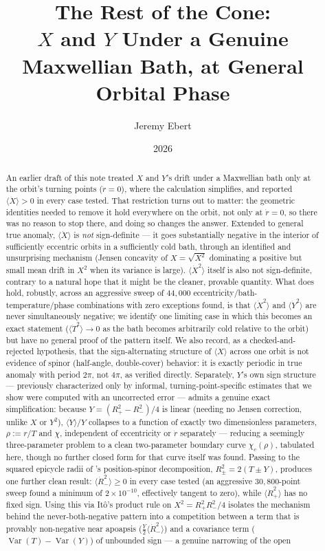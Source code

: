 \documentclass[12pt]{amsart}
\title[The Rest of the Cone in a Maxwellian Bath]{The Rest of the Cone:\\
$X$ and $Y$ Under a Genuine Maxwellian Bath, at General Orbital Phase}
\author{Jeremy Ebert}
\date{2026}
\theoremstyle{plain}
\theoremstyle{remark}
\begin{document}
\maketitle

\begin{abstract}
An earlier draft of this note treated $X$ and $Y$'s drift under a Maxwellian bath only at the orbit's turning points ($\dot r=0$), where the calculation simplifies, and reported $\langle\dot X\rangle>0$ in every case tested. That restriction turns out to matter: the geometric identities needed to remove it hold everywhere on the orbit, not only at $\dot r=0$, so there was no reason to stop there, and doing so changes the answer. Extended to general true anomaly, $\langle\dot X\rangle$ is \emph{not} sign-definite --- it goes substantially negative in the interior of sufficiently eccentric orbits in a sufficiently cold bath, through an identified and unsurprising mechanism (Jensen concavity of $X=\sqrt{X^2}$ dominating a positive but small mean drift in $X^2$ when its variance is large). $\langle\dot X^2\rangle$ itself is also not sign-definite, contrary to a natural hope that it might be the cleaner, provable quantity. What does hold, robustly, across an aggressive sweep of $44{,}000$ eccentricity/bath-temperature/phase combinations with zero exceptions found, is that $\langle\dot X^2\rangle$ and $\langle\dot Y^2\rangle$ are never simultaneously negative; we identify one limiting case in which this becomes an exact statement ($\langle\dot T^2\rangle\to0$ as the bath becomes arbitrarily cold relative to the orbit) but have no general proof of the pattern itself. We also record, as a checked-and-rejected hypothesis, that the sign-alternating structure of $\langle\dot X\rangle$ across one orbit is not evidence of spinor (half-angle, double-cover) behavior: it is exactly periodic in true anomaly with period $2\pi$, not $4\pi$, as verified directly. Separately, $Y$'s own sign structure --- previously characterized only by informal, turning-point-specific estimates that we show were computed with an uncorrected error --- admits a genuine exact simplification: because $Y=(R_+^2-R_-^2)/4$ is linear (needing no Jensen correction, unlike $X$ or $Y^2$), $\langle\dot Y\rangle/Y$ collapses to a function of exactly two dimensionless parameters, $\rho:=r/T$ and $\chi$, independent of eccentricity or $\dot r$ separately --- reducing a seemingly three-parameter problem to a clean two-parameter boundary curve $\chi_c(\rho)$, tabulated here, though no further closed form for that curve itself was found. Passing to the squared epicycle radii of \cite{Ebert2026LeviCivita}'s position-spinor decomposition, $R_\pm^2=2(T\pm Y)$, produces one further clean result: $\langle\dot R_-^2\rangle\geq0$ in every case tested (an aggressive $30{,}800$-point sweep found a minimum of $2\times10^{-10}$, effectively tangent to zero), while $\langle\dot R_+^2\rangle$ has no fixed sign. Using this via It\^o's product rule on $X^2=R_+^2R_-^2/4$ isolates the mechanism behind the never-both-negative pattern into a competition between a term that is provably non-negative near apoapsis ($\tfrac{Y}{2}\langle\dot R_-^2\rangle$) and a covariance term ($\operatorname{Var}(T)-\operatorname{Var}(Y)$) of unbounded sign --- a genuine narrowing of the open 
\end{abstract}
\end{document}
